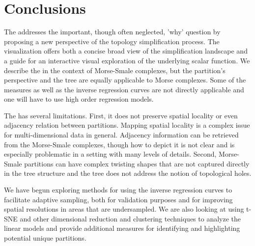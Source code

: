 \section{Conclusions}
\label{sec:conclusions}
The \RT addresses the important, though often neglected, 'why' question by  proposing a new perspective of the topology simplification process. The \RT visualization offers both a concise broad view of the simplification landscape and a guide for an interactive visual exploration of the underlying scalar function. We describe the \RT in the context of Morse-Smale complexes, but the partition's perspective and the tree are equally applicable to Morse complexes. Some of the measures as well as the inverse regression curves are not directly applicable and one will have to use high order regression models.

The \RT has several limitations. First, it does not preserve spatial locality or even adjacency relation between partitions. Mapping spatial locality is a complex issue for multi-dimensional data in general. Adjacency information can be retrieved from the Morse-Smale complexes, though how to depict it is not clear and is especially problematic in a setting with many levels of details. 
Second, Morse-Smale partitions can have complex twisting shapes that are not captured directly in the tree structure and the tree does not address the notion of topological holes. 

We have begun exploring methods for using the inverse regression curves to facilitate adaptive sampling, both for validation purposes and for improving spatial resolutions in areas that are undersampled. We are also looking at using t-SNE and other dimensional reduction and clustering techniques to analyze the linear models and provide additional measures for identifying and highlighting potential unique partitions.

